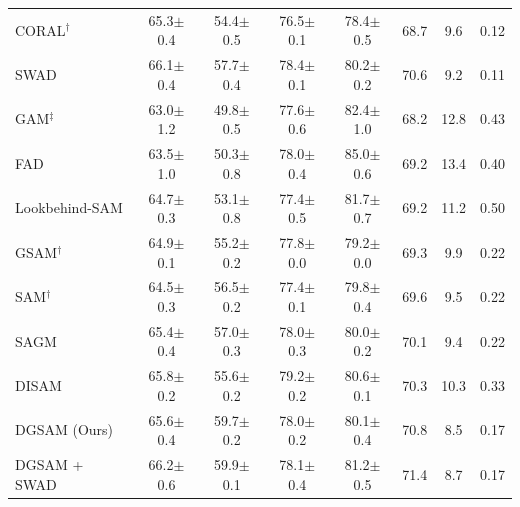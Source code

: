 \documentclass{article}
\theoremstyle{plain}
\theoremstyle{definition}
\theoremstyle{remark}
\begin{document}
\begin{table}[!ht]
\begin{tabular}{l|cccc|ccc}
CORAL\(^\dag\) \cite{sun2016coral}         & {65.3\scriptsize$\pm$0.4} & {54.4\scriptsize$\pm$0.5} & {76.5\scriptsize$\pm$0.1} & {78.4\scriptsize$\pm$0.5} & 68.7 & 9.6  & 0.12 \\
SWAD \cite{cha2021swad}         & {66.1\scriptsize$\pm$0.4} & {57.7\scriptsize$\pm$0.4} & {78.4\scriptsize$\pm$0.1} & {80.2\scriptsize$\pm$0.2} & 70.6 & 9.2  & 0.11 \\ \midrule
GAM\(^\ddag\) \cite{zhang2023gam}         & {63.0\scriptsize$\pm$1.2} & {49.8\scriptsize$\pm$0.5} & {77.6\scriptsize$\pm$0.6} & {82.4\scriptsize$\pm$1.0} & 68.2 & 12.8 & 0.43 \\ 
FAD \cite{zhang2023fad}         & {63.5\scriptsize$\pm$1.0} & {50.3\scriptsize$\pm$0.8} & {78.0\scriptsize$\pm$0.4} & {85.0\scriptsize$\pm$0.6} & 69.2 & 13.4 & 0.40 \\
Lookbehind-SAM \cite{mordido2024lookbehind}         & {64.7\scriptsize$\pm$0.3} & {53.1\scriptsize$\pm$0.8} & {77.4\scriptsize$\pm$0.5} & {81.7\scriptsize$\pm$0.7} & 69.2 & 11.2 & 0.50 \\
GSAM\(^\dag\) \cite{zhuang2022gsam}         & {64.9\scriptsize$\pm$0.1} & {55.2\scriptsize$\pm$0.2} & {77.8\scriptsize$\pm$0.0} & {79.2\scriptsize$\pm$0.0} & 69.3 & 9.9  & 0.22 \\
SAM\(^\dag\) \cite{foret2021sam}         & {64.5\scriptsize$\pm$0.3} & {56.5\scriptsize$\pm$0.2} & {77.4\scriptsize$\pm$0.1} & {79.8\scriptsize$\pm$0.4} & 69.6 & 9.5  & 0.22 \\
SAGM \cite{wang2023sagm}         & {65.4\scriptsize$\pm$0.4} & {57.0\scriptsize$\pm$0.3} & {78.0\scriptsize$\pm$0.3} & {80.0\scriptsize$\pm$0.2} & 70.1 & 9.4  & 0.22 \\
DISAM \cite{zhang2024disam}         & {65.8\scriptsize$\pm$0.2} & {55.6\scriptsize$\pm$0.2} & {79.2\scriptsize$\pm$0.2} & {80.6\scriptsize$\pm$0.1} & 70.3 & 10.3 & 0.33 \\
DGSAM (Ours)         & {65.6\scriptsize$\pm$0.4} & {59.7\scriptsize$\pm$0.2} & {78.0\scriptsize$\pm$0.2} & {80.1\scriptsize$\pm$0.4} & 70.8 & 8.5  & 0.17 \\
DGSAM + SWAD         & {66.2\scriptsize$\pm$0.6} & {59.9\scriptsize$\pm$0.1} & {78.1\scriptsize$\pm$0.4} & {81.2\scriptsize$\pm$0.5} & 71.4 & 8.7  & 0.17 \\ \bottomrule
\end{tabular}
\end{table}
\end{document}
